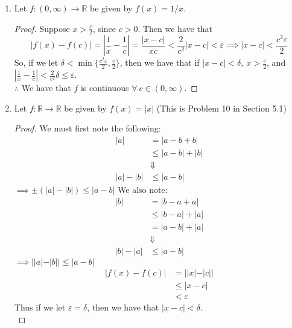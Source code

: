 \documentclass[12pt,letterpaper]{article}
\newcommand{\abs}[1]{\left\lvert #1 \right\rvert}
\newcommand{\R}{\mathbb{R}}
\theoremstyle{case}
\theoremstyle{definition}
\begin{document}
\begin{enumerate}
\begin{enumerate}
\begin{proof}
				$\therefore$ Since we have found definitions of $\delta$ that satisfy the definition of continuity, we have that $f$ is continuous $\forall c \in \R$.
			\end{proof}
			
			\item Let $f:(0,\infty) \to \R$ be given by $f(x)=1/x$. \\
			
			\begin{proof}
				Suppose $x>\frac{c}{2}$, since $c>0$. Then we have that
				\[\abs{f(x)-f(c)}=\abs{\frac{1}{x}-\frac{1}{c}}=\frac{|x-c|}{xc}<\frac{2}{c^2}|x-c|<\varepsilon \implies |x-c|<\frac{c^2\varepsilon}{2}\]
				So, if we let $\delta < \min \{\frac{c^2\varepsilon}{2}, \frac{c}{2}\}$, then we have that if $|x-c|<\delta,\ x>\frac{c}{2}$, and $\abs{\frac{1}{x}-\frac{1}{c}}<\frac{2}{c^2}\delta \leq \varepsilon$.\\
				
				$\therefore$ We have that $f$ is continuous $\forall\ c \in (0,\infty)$.
			\end{proof}
			
			\item Let $f:\R \to \R$ be given by $f(x)=|x|$ (This is Problem 10 in Section 5.1)\\
			
			\begin{proof}
				We must first note the following:
				\begin{align*}
					|a| &= |a-b+b| \\
					&\leq |a-b|+|b| \\
					&\Downarrow \\
					|a|-|b| &\leq |a-b|
				\end{align*}
				$\implies \pm(|a|-|b|) \leq |a-b|$
				We also note:
				\begin{align*}
					|b| &= |b-a+a| \\
					&\leq |b-a| + |a| \\
					&=|a-b|+|a| \\
					&\Downarrow \\
					|b|-|a| &\leq |a-b|
				\end{align*}
				$\implies ||a|-|b|| \leq |a-b|$
				\begin{align*}
					|f(x)-f(c)| &= ||x|-|c|| \\
					&\leq |x-c| \\
					&<\varepsilon
				\end{align*}
				Thus if we let $\varepsilon = \delta$, then we have that $|x-c|<\delta$.\\
				

\end{proof}
\end{enumerate}
\end{enumerate}
\end{document}
